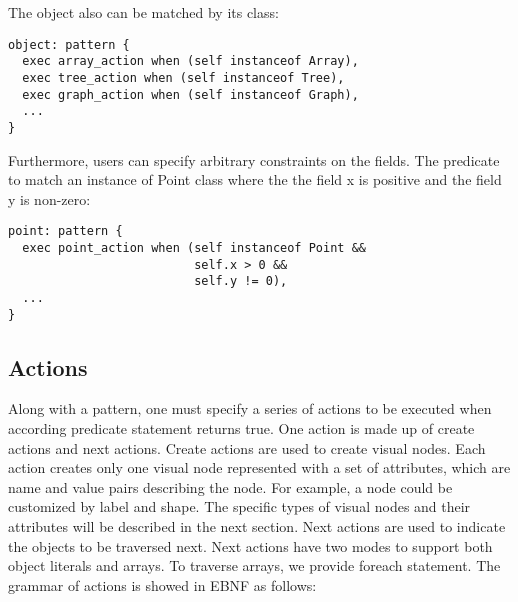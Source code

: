 The object also can be matched by its class:

\begin{lstlisting}
object: pattern {
  exec array_action when (self instanceof Array),
  exec tree_action when (self instanceof Tree),
  exec graph_action when (self instanceof Graph),
  ...
}
\end{lstlisting}

Furthermore, users can specify arbitrary constraints on the fields. The predicate to match an instance of Point class where the the field x is positive and the field y is non-zero: 

\begin{lstlisting}
point: pattern {
  exec point_action when (self instanceof Point &&
                          self.x > 0 &&
                          self.y != 0),
  ...
}
\end{lstlisting}

\subsection {Actions}

Along with a pattern, one must specify a series of actions to be executed when according predicate statement returns true. One action is made up of create actions and next actions. Create actions are used to create visual nodes. Each action creates only one visual node represented with a set of attributes, which are name and value pairs describing the node. For example, a node could be customized by label and shape. The specific types of visual nodes and their attributes will be described in the next section. Next actions are used to indicate the objects to be traversed next. Next actions have two modes to support both object literals and arrays. To traverse arrays, we provide foreach statement. The grammar of actions is showed in EBNF as follows:

